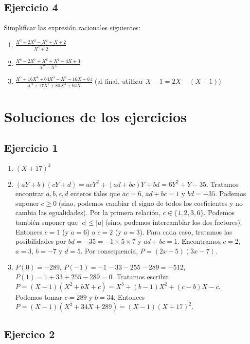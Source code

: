 \subsection*{Ejercicio 4}

Simplificar las expresión racionales siguientes:

\begin{enumerate}
\item $\frac{X^5+2X^3-X^2+X+2}{X^2+2}$
\item $\frac{X^8-2X^7+X^6+X^2-4X+3}{X^7 - X^6}$
\item $\frac{X^5+16X^4+64X^3-X^2-16X-64}{X^4+17X^3+80X^2+64X}$
  (al final, utilizar $X - 1 = 2X - {(X+1)}$)
\end{enumerate}

\section{Soluciones de los ejercicios}

\subsection*{Ejercicio 1}

\begin{enumerate}
\item ${(X+17)}^2$

\item 
  ${(aY + b)}{(cY + d)} = acY^2 + {(ad+bc)}Y + bd = 6 Y^2 + Y -35$.
  Tratamos encontrar $a,b,c,d$ enteros tales que
  $ac = 6$, $ad+bc = 1$ y $bd= -35$. Podemos suponer $c \geq 0$ (sino, podemos
  cambiar el signo de todos los coeficientes y no cambia las egualidades).
  Por la primera relación, $c \in \{ 1, 2, 3, 6 \}$. Podemos también suponer
  que ${|c|} \leq {|a|}$ (sino, podemos intercambiar los dos factores). Entonces
  $c = 1$ (y $a=6$) o $c = 2$ (y $a=3$). Para cada caso, tratamos las
  posibilidades por $bd = -35 = -1 \times 5 \times 7$ y
  $ad+bc = 1$. Encontramos $c = 2$, $a=3$, $b=-7$ y $d=5$.
  Por consequencia, $P = {(2x+5)}{(3x-7)}$.

\item $P(0) = -289$, $P(-1) = -1 -33 -255 -289 = -512$,
  $P(1) = 1 + 33 + 255 - 289 = 0$. Tratamos escribir
  $P = {(X - 1)}{(X^2 + bX + c)} = X^3 + {(b - 1)}X^2 + {(c - b)}X - c$.
  Podemos tomar $c = 289$ y $b = 34$. Entonces
  $P = {(X-1)}{(X^2 + 34X + 289)} = {(X-1)}{(X+17)}^2$.
\end{enumerate}

\subsection*{Ejercico 2}

